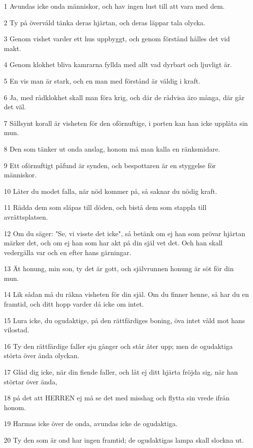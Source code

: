 \par 1 Avundas icke onda människor, och hav ingen lust till att vara med dem.
\par 2 Ty på övervåld tänka deras hjärtan, och deras läppar tala olycka.
\par 3 Genom vishet varder ett hus uppbyggt, och genom förstånd hålles det vid makt.
\par 4 Genom klokhet bliva kamrarna fyllda med allt vad dyrbart och ljuvligt är.
\par 5 En vis man är stark, och en man med förstånd är väldig i kraft.
\par 6 Ja, med rådklokhet skall man föra krig, och där de rådvisa äro många, där går det väl.
\par 7 Sällsynt korall är visheten för den oförnuftige, i porten kan han icke upplåta sin mun.
\par 8 Den som tänker ut onda anslag, honom må man kalla en ränksmidare.
\par 9 Ett oförnuftigt påfund är synden, och bespottaren är en styggelse för människor.
\par 10 Låter du modet falla, när nöd kommer på, så saknar du nödig kraft.
\par 11 Rädda dem som släpas till döden, och bistå dem som stappla till avrättsplatsen.
\par 12 Om du säger: "Se, vi visste det icke", så betänk om ej han som prövar hjärtan märker det, och om ej han som har akt på din själ vet det. Och han skall vedergälla var och en efter hans gärningar.
\par 13 Ät honung, min son, ty det är gott, och självrunnen honung är söt för din mun.
\par 14 Lik sådan må du räkna visheten för din själ. Om du finner henne, så har du en framtid, och ditt hopp varder då icke om intet.
\par 15 Lura icke, du ogudaktige, på den rättfärdiges boning, öva intet våld mot hans vilostad.
\par 16 Ty den rättfärdige faller sju gånger och står åter upp; men de ogudaktiga störta över ända olyckan.
\par 17 Gläd dig icke, när din fiende faller, och låt ej ditt hjärta fröjda sig, när han störtar över ända,
\par 18 på det att HERREN ej må se det med misshag och flytta sin vrede ifrån honom.
\par 19 Harmas icke över de onda, avundas icke de ogudaktiga.
\par 20 Ty den som är ond har ingen framtid; de ogudaktigas lampa skall slockna ut.

